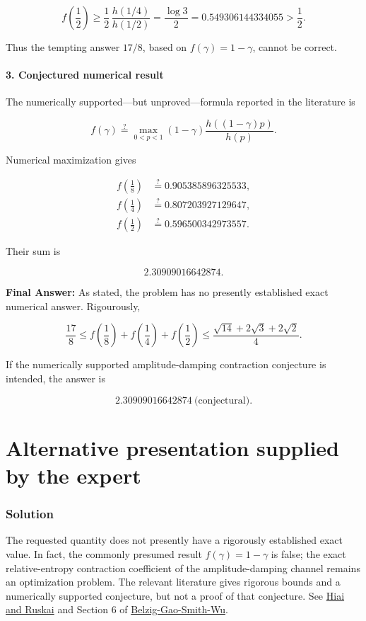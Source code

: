 \documentclass[11pt]{article}
\begin{document}
\[
f\left(\frac12\right)
\geq
\frac12\,\frac{h(1/4)}{h(1/2)}
=
\frac{\log3}{2}
=
0.549306144334055
>
\frac12.
\]

Thus the tempting answer $17/8$, based on $f(\gamma)=1-\gamma$, cannot be correct.

\paragraph*{3. Conjectured numerical result}

The numerically supported---but unproved---formula reported in the literature is

\[
f(\gamma)\stackrel{?}{=}
\max_{0<p<1}
(1-\gamma)
\frac{h((1-\gamma)p)}{h(p)}.
\]

Numerical maximization gives

\[
\begin{aligned}
f\left(\frac18\right)&\stackrel{?}{=}0.905385896325533,\\
f\left(\frac14\right)&\stackrel{?}{=}0.807203927129647,\\
f\left(\frac12\right)&\stackrel{?}{=}0.596500342973557.
\end{aligned}
\]

Their sum is

\[
2.30909016642874.
\]

\textbf{Final Answer:} As stated, the problem has no presently established exact numerical answer. Rigourously,

\[
\boxed{
\frac{17}{8}
\leq
f\left(\frac18\right)+f\left(\frac14\right)+f\left(\frac12\right)
\leq
\frac{\sqrt{14}+2\sqrt3+2\sqrt2}{4}
}.
\]

If the numerically supported amplitude-damping contraction conjecture is intended, the answer is

\[
\boxed{2.30909016642874\ \text{(conjectural)}}.
\]
\section*{Alternative presentation supplied by the expert}
\subsubsection*{Solution}
The requested quantity does not presently have a rigorously established exact value. In fact, the commonly presumed result $f(\gamma)=1-\gamma$ is false; the exact relative-entropy contraction coefficient of the amplitude-damping channel remains an optimization problem. The relevant literature gives rigorous bounds and a numerically supported conjecture, but not a proof of that conjecture. See \href{\detokenize{https://arxiv.org/abs/1508.03551}}{Hiai and Ruskai} and Section 6 of \href{\detokenize{https://arxiv.org/abs/2411.19890}}{Belzig-Gao-Smith-Wu}.
\end{document}
